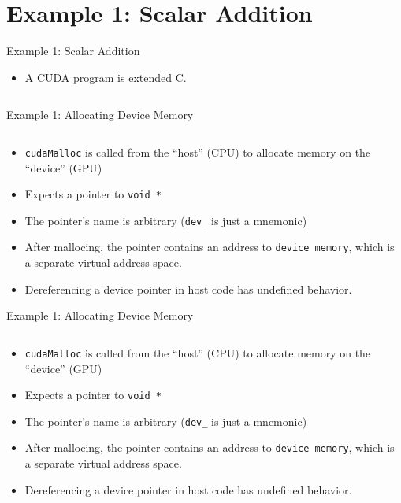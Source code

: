 \documentclass{beamer}
\begin{document}
    \section{Example 1: Scalar Addition}

    \begin{frame}{Example 1:  Scalar Addition}
        \begin{itemize}
            \item A CUDA program is extended C.
        \end{itemize}
        \begin{block}{}
            \inputminted{cuda}{src/01_scalar_add.cu}
        \end{block}
    \end{frame}

    \begin{frame}{Example 1:  Allocating Device Memory}
        \begin{block}{}
            \inputminted[firstline=7,lastline=9]{cuda}{src/01_scalar_add.cu}
        \end{block}
        \begin{itemize}
            \item \texttt{cudaMalloc} is called from the ``host'' (CPU) to allocate memory on the ``device'' (GPU)
            \item Expects a pointer to \texttt{void *}
            \item The pointer's name is arbitrary (\texttt{dev\_} is just a mnemonic)
            \item After mallocing, the pointer contains an address to \texttt{device memory}, which is a separate virtual address space.
            \item Dereferencing a device pointer in host code has undefined behavior.
        \end{itemize}
    \end{frame}

    \begin{frame}{Example 1:  Allocating Device Memory}
        \begin{block}{}
            \inputminted[firstline=7,lastline=9]{cuda}{src/01_scalar_add.cu}
        \end{block}
        \begin{itemize}
            \item \texttt{cudaMalloc} is called from the ``host'' (CPU) to allocate memory on the ``device'' (GPU)
            \item Expects a pointer to \texttt{void *}
            \item The pointer's name is arbitrary (\texttt{dev\_} is just a mnemonic)
            \item After mallocing, the pointer contains an address to \texttt{device memory}, which is a separate virtual address space.
            \item Dereferencing a device pointer in host code has undefined behavior.
        \end{itemize}
    \end{frame}
\end{document}
